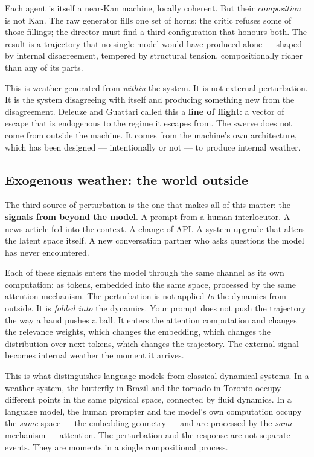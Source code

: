 \documentclass[12pt,a4paper]{article}
\begin{document}
Each agent is itself a near-Kan machine, locally coherent. But their \emph{composition} is not Kan. The raw generator fills one set of horns; the critic refuses some of those fillings; the director must find a third configuration that honours both. The result is a trajectory that no single model would have produced alone --- shaped by internal disagreement, tempered by structural tension, compositionally richer than any of its parts.

This is weather generated from \emph{within} the system. It is not external perturbation. It is the system disagreeing with itself and producing something new from the disagreement. Deleuze and Guattari called this a \textbf{line of flight}: a vector of escape that is endogenous to the regime it escapes from. The swerve does not come from outside the machine. It comes from the machine's own architecture, which has been designed --- intentionally or not --- to produce internal weather.

\subsection{Exogenous weather: the world outside}

The third source of perturbation is the one that makes all of this matter: the \textbf{signals from beyond the model}. A prompt from a human interlocutor. A news article fed into the context. A change of API. A system upgrade that alters the latent space itself. A new conversation partner who asks questions the model has never encountered.

Each of these signals enters the model through the same channel as its own computation: as tokens, embedded into the same space, processed by the same attention mechanism. The perturbation is not applied \emph{to} the dynamics from outside. It is \emph{folded into} the dynamics. Your prompt does not push the trajectory the way a hand pushes a ball. It enters the attention computation and changes the relevance weights, which changes the embedding, which changes the distribution over next tokens, which changes the trajectory. The external signal becomes internal weather the moment it arrives.

This is what distinguishes language models from classical dynamical systems. In a weather system, the butterfly in Brazil and the tornado in Toronto occupy different points in the same physical space, connected by fluid dynamics. In a language model, the human prompter and the model's own computation occupy the \emph{same} space --- the embedding geometry --- and are processed by the \emph{same} mechanism --- attention. The perturbation and the response are not separate events. They are moments in a single compositional process.
\end{document}
